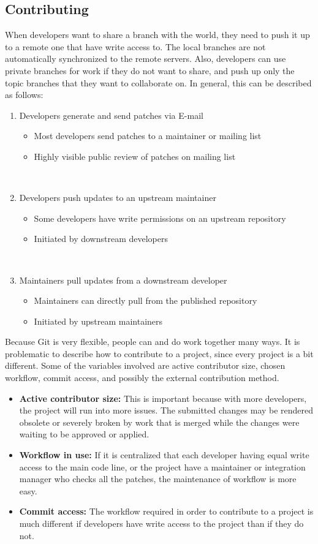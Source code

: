\documentclass[draftclsnofoot,journal,onecolumn,12pt]{IEEEtran}
\begin{document}
\subsection{Contributing}
When developers want to share a branch with the world, they need to push it up to a remote one that have write access to. The local branches are not automatically synchronized to the remote servers. Also, developers can use private branches for work if they do not want to share, and push up only the topic branches that they want to collaborate on. In general, this can be described as follows:
\begin{enumerate}
  \item Developers generate and send patches via E-mail
    \begin{itemize}
      \item Most developers send patches to a maintainer or mailing list
      \item Highly visible public review of patches on mailing list
    \end{itemize}
\item Developers push updates to an upstream maintainer
    \begin{itemize}
      \item Some developers have write permissions on an upstream repository
      \item Initiated by downstream developers
    \end{itemize}
  \item Maintainers pull updates from a downstream developer
    \begin{itemize}
      \item Maintainers can directly pull from the published repository
      \item Initiated by upstream maintainers
    \end{itemize}
  \end{enumerate}

 Because Git is very flexible, people can and do work together many ways. It is problematic to describe how to contribute to a project, since every project is a bit different. Some of the variables involved are active contributor size, chosen workflow, commit access, and possibly the external contribution method.
\begin{itemize}
  \item \textbf{Active contributor size:} This is important because with more developers, the project will run into more issues. The submitted changes may be rendered obsolete or severely broken by work that is merged while the changes were waiting to be approved or applied.
  \item \textbf{Workflow in use:} If it is centralized that each developer having equal write access to the main code line, or the project have a maintainer or integration manager who checks all the patches, the maintenance of workflow is more easy.
  \item \textbf{Commit access:} The workflow required in order to contribute to a project is much different if developers have write access to the project than if they do not.
\end{itemize}
\end{document}
